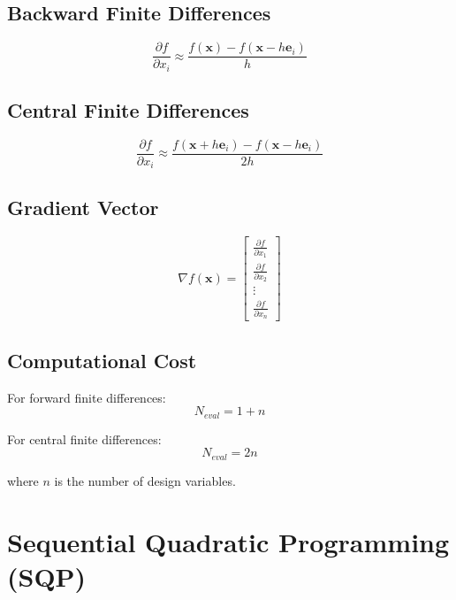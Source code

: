 \documentclass{article}
\begin{document}
\subsection{Backward Finite Differences}
\begin{equation}
\frac{\partial f}{\partial x_i} \approx \frac{f(\mathbf{x}) - f(\mathbf{x} - h \mathbf{e}_i)}{h}
\end{equation}

\subsection{Central Finite Differences}
\begin{equation}
\frac{\partial f}{\partial x_i} \approx \frac{f(\mathbf{x} + h \mathbf{e}_i) - f(\mathbf{x} - h \mathbf{e}_i)}{2h}
\end{equation}

\subsection{Gradient Vector}
\begin{equation}
\nabla f(\mathbf{x}) = \begin{bmatrix}
\frac{\partial f}{\partial x_1} \\
\frac{\partial f}{\partial x_2} \\
\vdots \\
\frac{\partial f}{\partial x_n}
\end{bmatrix}
\end{equation}

\subsection{Computational Cost}
For forward finite differences:
\begin{equation}
N_{eval} = 1 + n
\end{equation}

For central finite differences:
\begin{equation}
N_{eval} = 2n
\end{equation}

where $n$ is the number of design variables.

\section{Sequential Quadratic Programming (SQP)}
\end{document}
